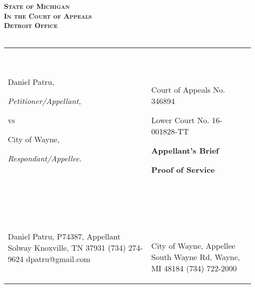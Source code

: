 \documentclass[12pt,\documentclassflag]{michiganCourtOfAppealsBrief}
\begin{document}
\begin{centering}
\bf\scshape State of Michigan\\In the Court of Appeals\\Detroit Office\\~\\ 
\rm 

\makeandtab
\setlength{\tabcolsep}{20pt}%
\begin{tabular}{p{} p{}}
\cline{1-2}
  {~

  \raggedright Daniel Patru,\par
  \hfill\textit{Petitioner/Appellant,}
  \vspace{.5\baselineskip}\par
  vs\par
  \vspace{.5\baselineskip}
  \raggedright City of Wayne,\par
  \hfill\textit{Respondant/Appellee.}
  
  ~} &  {~
       \par\par
       \hfill Court of Appeals No. 346894\par
       \hfill Lower Court No. 16-001828-TT\par\vspace{\baselineskip}
       \hfill \textbf{Appellant's Brief}\par
       \hfill \textbf{Proof of Service}       
  ~}
  \\ \cline{1-2}\vspace{2mm}
  {~ \par
  Daniel Patru, P74387, Appellant\newline%
  3309 Solway\newline%
  Knoxville, TN 37931\newline%
  (734) 274-9624\newline%
  dpatru@gmail.com\newline\newline%
  ~} & {~ \par~\par
       
       City of Wayne, Appellee\newline%
       3355 South Wayne Rd,\newline%
       Wayne, MI 48184\newline%
       (734) 722-2000\newline\newline%

}
\end{tabular}
\end{centering}
\end{document}
